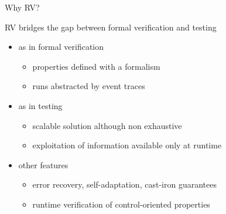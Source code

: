 \documentclass[10pt,usenames,dvipsnames]{beamer}
\begin{document}

\begin{frame}{Why RV?}
  \begin{block}{RV bridges the gap between formal verification and testing}
    \begin{itemize}
    \item as in formal verification
      \begin{itemize}
      \item properties defined with a formalism
      \item runs abstracted by event traces
      \end{itemize}
    \item as in testing
      \begin{itemize}
      \item scalable solution although non exhaustive
      \item exploitation of information available only at runtime
      \end{itemize}
    \item other features
      \begin{itemize}
      \item error recovery, self-adaptation, cast-iron guarantees
      \item runtime verification of control-oriented properties
      \end{itemize}
    \end{itemize}
  \end{block}
\end{frame}


\end{document}
